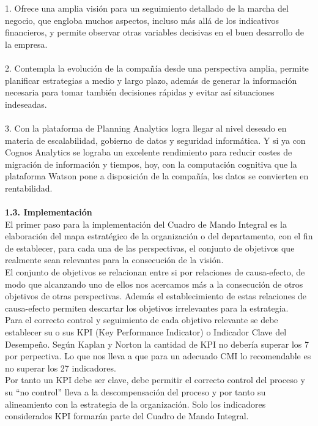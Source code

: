 \documentclass[twoside,twocolumn]{article}
\begin{document}
\begin{flushright}
\begin{itemize}
1. Ofrece una amplia visión para un seguimiento detallado de la marcha del negocio, que engloba muchos aspectos, incluso más allá de los indicativos financieros, y permite observar otras variables decisivas en el buen desarrollo de la empresa.\\
\textbf{}\\
2. Contempla la evolución de la compañía desde una perspectiva amplia, permite planificar estrategias a medio y largo plazo, además de generar la información necesaria para tomar también decisiones rápidas y evitar así situaciones indeseadas.\\
\textbf{}\\
3. Con la plataforma de Planning Analytics logra llegar al nivel deseado en materia de escalabilidad, gobierno de datos y seguridad informática. Y si ya con Cognos Analytics se lograba un excelente rendimiento para reducir costes de migración de información y tiempos, hoy, con la computación cognitiva que la plataforma Watson pone a disposición de la compañía, los datos se convierten en rentabilidad.\\
\textbf{}\\

\textbf{1.3.  Implementación}\\

El primer paso para la implementación del Cuadro de Mando Integral es la elaboración del mapa estratégico de la organización o del departamento, con el fin de establecer, para cada una de las perspectivas, el conjunto de objetivos que realmente sean relevantes para la consecución de la visión.\\

El conjunto de objetivos se relacionan entre si por relaciones de causa-efecto, de modo que alcanzando uno de ellos nos acercamos más a la consecución de otros objetivos de otras perspectivas. Además el establecimiento de estas relaciones de causa-efecto permiten descartar los objetivos irrelevantes para la estrategia.\\

Para el correcto control y seguimiento de cada objetivo relevante se debe establecer su o sus KPI (Key Performance Indicator) o Indicador Clave del Desempeño. Según Kaplan y Norton la cantidad de KPI no debería superar los 7 por perpectiva. Lo que nos lleva a que para un adecuado CMI lo recomendable es no superar los 27 indicadores.\\

Por tanto un KPI debe ser clave, debe permitir el correcto control del proceso y su “no control” lleva a la descompensación del proceso y por tanto su alineamiento con la estrategia de la organización. Solo los indicadores considerados KPI formarán parte del Cuadro de Mando Integral.\\
\textbf{}\\
\textbf{}\\
\textbf{}\\


\end{itemize}
\end{flushright}
\end{document}
